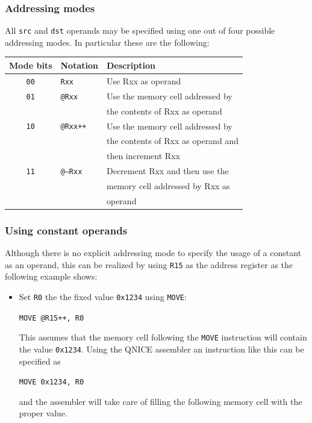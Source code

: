 \documentclass{beamer}
\begin{document}
%
   \begin{frame}
    \frametitle{Addressing modes}
    All {\tt src} and {\tt dst} operands may be specified using one out of 
    four possible addressing modes. In particular these are the following:
    \begin{center}
     \begin{tabular}{|c|l|l|}
      \hline
       Mode bits&Notation&Description\\
      \hline
       {\tt 00}&{\tt Rxx}&Use Rxx as operand\\
       {\tt 01}&{\tt @Rxx}&Use the memory cell addressed by\\
               &          &the contents of Rxx as operand\\
       {\tt 10}&{\tt @Rxx++}&Use the memory cell addressed by\\
               &          &the contents of Rxx as operand and\\
               &          &then increment Rxx\\
       {\tt 11}&{\tt @--Rxx}&Decrement Rxx and then use the\\
               &          &memory cell addressed by Rxx as\\
               &          &operand\\
      \hline
     \end{tabular}
    \end{center}
   \end{frame}
%
   \begin{frame}
    \frametitle{Using constant operands}
    Although there is no explicit addressing mode to specify the usage of
    a constant as an operand, this can be realized by using {\tt R15} as
    the address register as the following example shows:
    \begin{itemize}
     \item Set {\tt R0} the the fixed value {\tt 0x1234} using {\tt MOVE}:
      \begin{center}
       {\tt MOVE @R15++, R0}
      \end{center}
      This assumes that the memory cell following the {\tt MOVE} instruction
      will contain the value {\tt 0x1234}. Using the QNICE assembler an 
      instruction like this can be specified as
      \begin{center}
       {\tt MOVE 0x1234, R0}
      \end{center}
      and the assembler will take care of filling the following memory cell
      with the proper value.
    \end{itemize}
   \end{frame}
\end{document}
